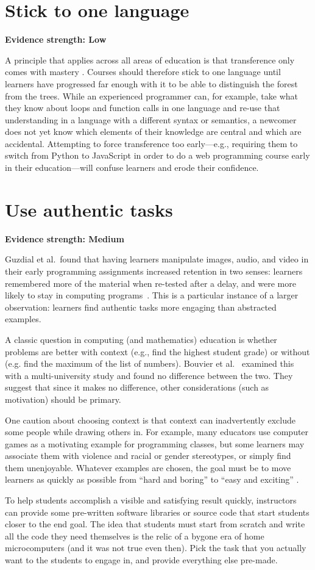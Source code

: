 \documentclass[10pt,letterpaper]{article}
\newcommand{\rulemajor}[2]{\section{#1}\label{#2}}
\newcommand{\evidence}[1]{\vspace{-0.3cm}\textbf{Evidence strength: #1}\vspace{0.5cm}}
\begin{document}
\rulemajor{Stick to one language}{one-language}
\evidence{Low}

A principle that applies across all areas of education is that
transference only comes with mastery \cite{gick-holyoak}.
Courses should therefore stick to one language until learners have progressed far enough with it
to be able to distinguish the forest from the trees.
While an experienced programmer can,
for example,
take what they know about loops and function calls in one language
and re-use that understanding in a language with a different syntax or semantics,
a newcomer does not yet know which elements of their knowledge are central
and which are accidental.
Attempting to force transference too early---e.g.,
requiring them to switch from Python to JavaScript in order to do a web programming course
early in their education---will confuse learners and erode their confidence.

\rulemajor{Use authentic tasks}{authentic-tasks}
\evidence{Medium}

Guzdial et al.\ found that having learners manipulate images, audio, and video
in their early programming assignments
increased retention in two senses:
learners remembered more of the material when re-tested after a delay,
and were more likely to stay in computing programs~\cite{guzdial-media}.
This is a particular instance of a larger observation:
learners find authentic tasks more engaging than abstracted examples.

A classic question in computing (and mathematics) education
is whether problems are better with context (e.g., find the highest student grade)
or without (e.g. find the maximum of the list of numbers).
Bouvier et al.~\cite{bouvier-context} examined this with a multi-university study
and found no difference between the two.
They suggest that since it makes no difference,
other considerations (such as motivation) should be primary.

One caution about choosing context is that context can inadvertently exclude some people while drawing others in.
For example,
many educators use computer games as a motivating example for programming classes,
but some learners may associate them with violence and racial or gender stereotypes,
or simply find them unenjoyable.
Whatever examples are chosen,
the goal must be to move learners as quickly as possible
from ``hard and boring'' to ``easy and exciting'' \cite{repenning}.

To help students accomplish a visible and satisfying result
quickly, instructors can provide some pre-written software libraries or source code that start students
closer to the end goal.  The idea that students must start from scratch and write all the code they need
themselves is the relic of a bygone era of home microcomputers (and it was not true even then).
Pick the task that you actually want to the students to engage in, and provide everything else pre-made.
\end{document}
